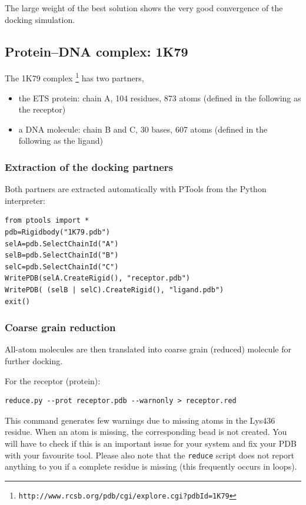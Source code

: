 \documentclass[12pt,a4paper]{article}
\begin{document}
The large weight of the best solution shows the very good convergence of the
docking simulation.

\subsection{Protein--DNA complex: 1K79}


The 1K79 complex \footnote{\tt http://www.rcsb.org/pdb/cgi/explore.cgi?pdbId=1K79} 
has two partners,
\begin{itemize}
\item the ETS protein: chain A, 104 residues, 873 atoms (defined in the following as the receptor)
\item a DNA molecule: chain B and C, 30 bases, 607 atoms (defined in the following as the ligand)
\end{itemize}

\subsubsection{Extraction of the docking partners}

Both partners are extracted automatically with PTools from the Python interpreter:
\begin{verbatim}
from ptools import *
pdb=Rigidbody("1K79.pdb")
selA=pdb.SelectChainId("A")
selB=pdb.SelectChainId("B")
selC=pdb.SelectChainId("C")
WritePDB(selA.CreateRigid(), "receptor.pdb")
WritePDB( (selB | selC).CreateRigid(), "ligand.pdb")
exit()
\end{verbatim}

\subsubsection{Coarse grain reduction}

All-atom molecules are then translated into coarse grain (reduced) molecule for further docking. 

For the receptor (protein): 
\begin{verbatim}
reduce.py --prot receptor.pdb --warnonly > receptor.red
\end{verbatim}

This command generates few warnings due to missing atoms in the Lys436 residue. 
When an atom is missing, the corresponding bead is not created. You will have to check
 if this is an important issue for your system and fix your PDB with your favourite tool.
Please also note that the \verb!reduce! script does not report anything to you if a complete
 residue is missing (this frequently occurs in loops).
\end{document}
